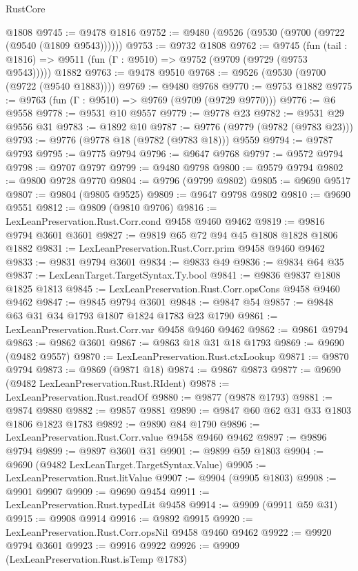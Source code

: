 \begin{lexlean}{RustCore}
\begin{coremodule}
    @1808
@9745 := @9478 @1816
@9752 := @9480 (@9526 (@9530 (@9700 (@9722 (@9540 (@1809 @9543))))))
@9753 := @9732 @1808
@9762 := @9745
    (fun (tail : @1816) => @9511 (fun (Γ : @9510) => @9752 (@9709 (@9729 (@9753 @9543)))))
    @1882
@9763 := @9478 @9510
@9768 := @9526 (@9530 (@9700 (@9722 (@9540 @1883))))
@9769 := @9480 @9768
@9770 := @9753 @1882
@9775 := @9763 (fun (Γ : @9510) => @9769 (@9709 (@9729 @9770)))
@9776 := @6 @9558
@9778 := @9531 @10 @9557
@9779 := @9778 @23
@9782 := @9531 @29 @9556 @31
@9783 := @1892 @10
@9787 := @9776 (@9779 (@9782 (@9783 @23)))
@9793 := @9776 (@9778 @18 (@9782 (@9783 @18))) @9559
@9794 := @9787 @9793
@9795 := @9775 @9794
@9796 := @9647 @9768
@9797 := @9572 @9794
@9798 := @9707 @9797
@9799 := @9480 @9798
@9800 := @9579 @9794
@9802 := @9800 @9728 @9770
@9804 := @9796 (@9799 @9802)
@9805 := @9690 @9517
@9807 := @9804 (@9805 @9525)
@9809 := @9647 @9798 @9802
@9810 := @9690 @9551
@9812 := @9809 (@9810 @9706)
@9816 := LexLeanPreservation.Rust.Corr.cond @9458 @9460 @9462
@9819 := @9816 @9794 @3601 @3601
@9827 := @9819 @65 @72 @94 @45 @1808 @1828 @1806 @1882
@9831 := LexLeanPreservation.Rust.Corr.prim @9458 @9460 @9462
@9833 := @9831 @9794 @3601
@9834 := @9833 @49
@9836 := @9834 @64 @35
@9837 := LexLeanTarget.TargetSyntax.Ty.bool
@9841 := @9836 @9837 @1808 @1825 @1813
@9845 := LexLeanPreservation.Rust.Corr.opsCons @9458 @9460 @9462
@9847 := @9845 @9794 @3601
@9848 := @9847 @54
@9857 := @9848 @63 @31 @34 @1793 @1807 @1824 @1783 @23 @1790
@9861 := LexLeanPreservation.Rust.Corr.var @9458 @9460 @9462
@9862 := @9861 @9794
@9863 := @9862 @3601
@9867 := @9863 @18 @31 @18 @1793
@9869 := @9690 (@9482 @9557)
@9870 := LexLeanPreservation.Rust.ctxLookup
@9871 := @9870 @9794
@9873 := @9869 (@9871 @18)
@9874 := @9867 @9873
@9877 := @9690 (@9482 LexLeanPreservation.Rust.RIdent)
@9878 := LexLeanPreservation.Rust.readOf
@9880 := @9877 (@9878 @1793)
@9881 := @9874 @9880
@9882 := @9857 @9881
@9890 := @9847 @60 @62 @31 @33 @1803 @1806 @1823 @1783
@9892 := @9890 @84 @1790
@9896 := LexLeanPreservation.Rust.Corr.value @9458 @9460 @9462
@9897 := @9896 @9794
@9899 := @9897 @3601 @31
@9901 := @9899 @59 @1803
@9904 := @9690 (@9482 LexLeanTarget.TargetSyntax.Value)
@9905 := LexLeanPreservation.Rust.litValue
@9907 := @9904 (@9905 @1803)
@9908 := @9901 @9907
@9909 := @9690 @9454
@9911 := LexLeanPreservation.Rust.typedLit @9458
@9914 := @9909 (@9911 @59 @31)
@9915 := @9908 @9914
@9916 := @9892 @9915
@9920 := LexLeanPreservation.Rust.Corr.opsNil @9458 @9460 @9462
@9922 := @9920 @9794 @3601
@9923 := @9916 @9922
@9926 := @9909 (LexLeanPreservation.Rust.isTemp @1783)

\end{coremodule}
\end{lexlean}

